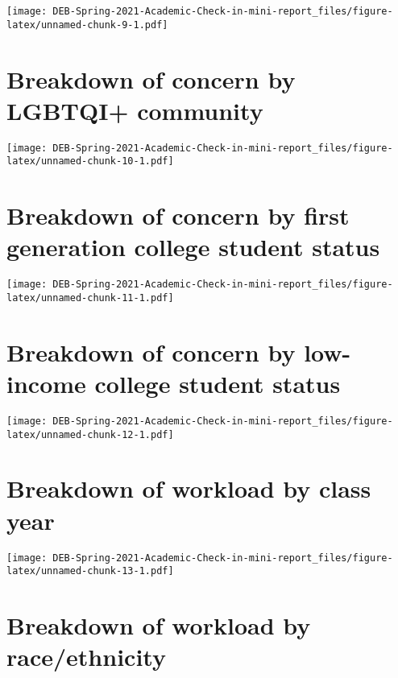 \documentclass[
]{article}
\begin{document}
\texttt{[image: DEB-Spring-2021-Academic-Check-in-mini-report\_files/figure-latex/unnamed-chunk-9-1.pdf]}

\hypertarget{breakdown-of-concern-by-lgbtqi-community}{%
\section{Breakdown of concern by LGBTQI+
community}\label{breakdown-of-concern-by-lgbtqi-community}}

\texttt{[image: DEB-Spring-2021-Academic-Check-in-mini-report\_files/figure-latex/unnamed-chunk-10-1.pdf]}

\hypertarget{breakdown-of-concern-by-first-generation-college-student-status}{%
\section{Breakdown of concern by first generation college student
status}\label{breakdown-of-concern-by-first-generation-college-student-status}}

\texttt{[image: DEB-Spring-2021-Academic-Check-in-mini-report\_files/figure-latex/unnamed-chunk-11-1.pdf]}

\hypertarget{breakdown-of-concern-by-low-income-college-student-status}{%
\section{Breakdown of concern by low-income college student
status}\label{breakdown-of-concern-by-low-income-college-student-status}}

\texttt{[image: DEB-Spring-2021-Academic-Check-in-mini-report\_files/figure-latex/unnamed-chunk-12-1.pdf]}

\hypertarget{breakdown-of-workload-by-class-year}{%
\section{Breakdown of workload by class
year}\label{breakdown-of-workload-by-class-year}}

\texttt{[image: DEB-Spring-2021-Academic-Check-in-mini-report\_files/figure-latex/unnamed-chunk-13-1.pdf]}

\hypertarget{breakdown-of-workload-by-raceethnicity}{%
\section{Breakdown of workload by
race/ethnicity}\label{breakdown-of-workload-by-raceethnicity}}
\end{document}
